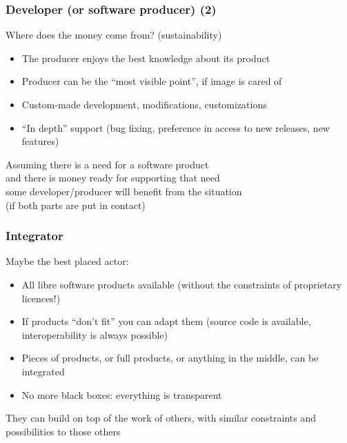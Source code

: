 
\begin{frame}
\frametitle{Developer (or software producer) (2)}

Where does the money come from? (sustainability)
\begin{itemize}
\item The producer enjoys the best knowledge about its product
\item Producer can be the ``most visible point'', if image is cared of
\item Custom-made development, modifications, customizations
\item ``In depth'' support (bug fixing, preference in access to new releases, new features)
\end{itemize}

\begin{center}
{\large Assuming there is a need for a software product \\
  and there is money ready for supporting that need \\
  some developer/producer will benefit from the situation \\
  (if both parts are put in contact)
}
\end{center}
\end{frame}



\begin{frame}
\frametitle{Integrator}

Maybe the best placed actor:

\begin{itemize}
\item All libre software products available (without the constraints of proprietary licences!)
\item If products ``don't fit'' you can adapt them (source code is available, interoperability is always possible)
\item Pieces of products, or full products, or anything in the middle, can be integrated
\item No more black boxes: everything is transparent 
\end{itemize}

\begin{center}
{\large They can build on top of the work of others, with similar constraints and possibilities to those others}
\end{center}
\end{frame}


